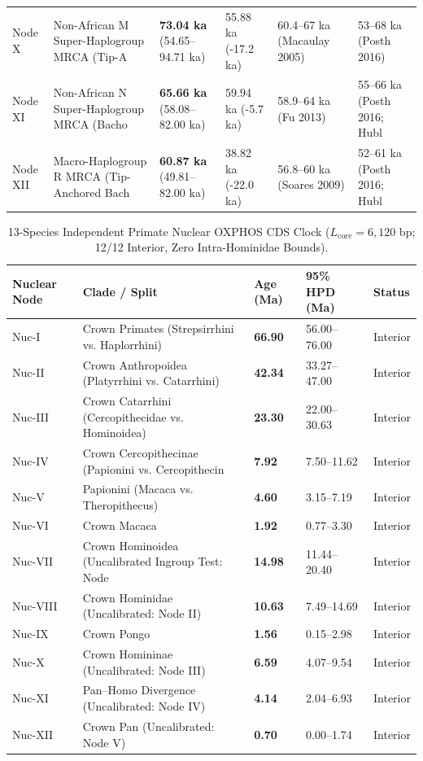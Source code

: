 \documentclass[10pt,letterpaper]{article}
\begin{document}
\begin{longtable}{llllll}
Node X & Non-African M Super-Haplogroup MRCA (Tip-A & \textbf{73.04 ka} (54.65--94.71 ka) & 55.88 ka (-17.2 ka) & 60.4--67 ka (Macaulay 2005) & 53--68 ka (Posth 2016) \\
Node XI & Non-African N Super-Haplogroup MRCA (Bacho & \textbf{65.66 ka} (58.08--82.00 ka) & 59.94 ka (-5.7 ka) & 58.9--64 ka (Fu 2013) & 55--66 ka (Posth 2016; Hubl \\
Node XII & Macro-Haplogroup R MRCA (Tip-Anchored Bach & \textbf{60.87 ka} (49.81--82.00 ka) & 38.82 ka (-22.0 ka) & 56.8--60 ka (Soares 2009) & 52--61 ka (Posth 2016; Hubl \\
\bottomrule
\end{longtable}

\begin{longtable}{lllll}
\caption{13-Species Independent Primate Nuclear OXPHOS CDS Clock ($L_{\mathrm{core}} = 6,120$ bp; 12/12 Interior, Zero Intra-Hominidae Bounds).} \\
\toprule
Nuclear Node & Clade / Split & Age (Ma) & 95\% HPD (Ma) & Status \\
\midrule
\endfirsthead
Nuc-I & Crown Primates (Strepsirrhini vs. Haplorrhini) & \textbf{66.90} & 56.00--76.00 & Interior \\
Nuc-II & Crown Anthropoidea (Platyrrhini vs. Catarrhini) & \textbf{42.34} & 33.27--47.00 & Interior \\
Nuc-III & Crown Catarrhini (Cercopithecidae vs. Hominoidea) & \textbf{23.30} & 22.00--30.63 & Interior \\
Nuc-IV & Crown Cercopithecinae (Papionini vs. Cercopithecin & \textbf{7.92} & 7.50--11.62 & Interior \\
Nuc-V & Papionini (Macaca vs. Theropithecus) & \textbf{4.60} & 3.15--7.19 & Interior \\
Nuc-VI & Crown Macaca & \textbf{1.92} & 0.77--3.30 & Interior \\
Nuc-VII & Crown Hominoidea (Uncalibrated Ingroup Test: Node  & \textbf{14.98} & 11.44--20.40 & Interior \\
Nuc-VIII & Crown Hominidae (Uncalibrated: Node II) & \textbf{10.63} & 7.49--14.69 & Interior \\
Nuc-IX & Crown Pongo & \textbf{1.56} & 0.15--2.98 & Interior \\
Nuc-X & Crown Homininae (Uncalibrated: Node III) & \textbf{6.59} & 4.07--9.54 & Interior \\
Nuc-XI & Pan--Homo Divergence (Uncalibrated: Node IV) & \textbf{4.14} & 2.04--6.93 & Interior \\
Nuc-XII & Crown Pan (Uncalibrated: Node V) & \textbf{0.70} & 0.00--1.74 & Interior \\
\bottomrule
\end{longtable}
\end{document}

